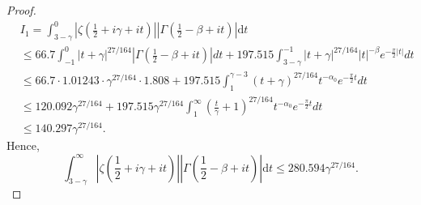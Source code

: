 \documentclass[reqno]{amsart}
\numberwithin{equation}{section}
\theoremstyle{remark}
\begin{document}
\begin{proof}
\begin{equation}
    \begin{aligned}
        &I_1=\int_{3-\gamma}^{0} \left|\zeta\left(\frac{1}{2}+i\gamma+it\right)\right|\left| \Gamma\left(\frac{1}{2}-\beta+it\right)\right|\text{d} t\\&\le 66.7\int_{-1}^{0}|t+\gamma|^{ 27/164}\left| \Gamma\left(\frac{1}{2}-\beta+it\right)\right|dt+197.515 \int_{3-\gamma}^{-1}|t+\gamma|^{ 27/164}|t|^{-\beta}e^{-\frac{\pi}{2}|t|}dt\\&\le 66.7\cdot 1.01243\cdot \gamma^{27/164}\cdot 1.808+ 197.515\int_{1}^{\gamma-3}(t+\gamma)^{ 27/164}t^{-\alpha_0}e^{-\frac{\pi}{2}t}dt\\&\le 120.092\gamma^{27/164}+197.515 \gamma^{27/164}\int_{1}^{\infty}\left(\frac{t}{\gamma}+1\right)^{ 27/164}t^{-\alpha_0}e^{-\frac{\pi}{2}t}dt\\&\le 140.297\gamma^{27/164}.
    \end{aligned}
\end{equation}
Hence,
\begin{equation}\label{thirdint}
    \int_{3 - \gamma}^{\infty} \left|\zeta\left(\frac{1}{2}+i\gamma+it\right)\right|\left| \Gamma\left(\frac{1}{2}-\beta+it\right)\right|\text{d} t \le 280.594\gamma^{27/164}.
\end{equation}


\end{proof}
\end{document}
